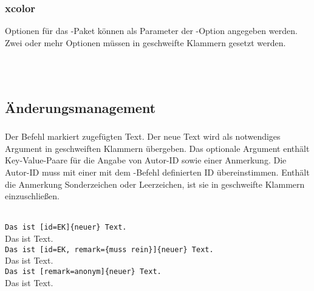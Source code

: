 \subsubsection{xcolor}

Optionen für das -Paket können als Parameter der -Option angegeben werden.
Zwei oder mehr Optionen müssen in geschweifte Klammern gesetzt werden.

\begin{chusage}
		\>\\
	\usageexample
		\>\\
		\>
\end{chusage}




\subsection{Änderungsmanagement}
\label{sec:user:changemanagement}

\subsubsection{}
\DescribeMacro{\added}

Der Befehl  markiert zugefügten Text.
Der neue Text wird als notwendiges Argument in geschweiften Klammern übergeben.
Das optionale Argument enthält Key-Value-Paare für die Angabe von Autor-ID sowie einer Anmerkung.
Die Autor-ID muss mit einer mit dem -Befehl definierten ID übereinstimmen.
Enthält die Anmerkung Sonderzeichen oder Leerzeichen, ist sie in geschweifte Klammern einzuschließen.

\begin{chusage}
		\>\\
	\usageexample
		\>\texttt{Das ist [id=EK]\{neuer\} Text.}\\
		\>Das ist  Text.\\
		\>\texttt{Das ist [id=EK, remark=\{muss rein\}]\{neuer\} Text.}\\
		\>Das ist  Text.\\
		\>\texttt{Das ist [remark=anonym]\{neuer\} Text.}\\
		\>Das ist  Text.
\end{chusage}



